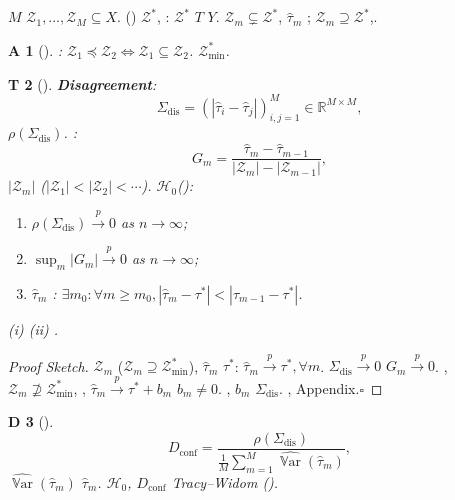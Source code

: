 \documentclass[11pt,a4paper,twoside]{article}
\newtheorem{theorem}Theorem[section]
\newtheorem{definition}[theorem]Definition
\newtheorem{assumption}[theorem]Assumption
\DeclareMathOperator*{\Var}{\mathbb{V}\mathrm{ar}}
\begin{document}
\subsection{}
 $M$ $\mathcal{Z}_1, \ldots, \mathcal{Z}_M \subseteq X$.
() $\mathcal{Z}^*$, 
: $\mathcal{Z}^*$ $T$ $Y$.
 $\mathcal{Z}_m \subsetneq \mathcal{Z}^*$, $\hat{\tau}_m$ ; 
 $\mathcal{Z}_m \supseteq \mathcal{Z}^*$,.
\begin{assumption}[]\label{ass:poset}
: $\mathcal{Z}_1 \preceq \mathcal{Z}_2 \iff \mathcal{Z}_1 \subseteq \mathcal{Z}_2$.
 $\mathcal{Z}_{\min}^*$.
\end{assumption}
\begin{theorem}[]\label{thm:confound}
\textbf{Disagreement}: 
\[
\Sigma_{\text{dis}} = \left(|\hat{\tau}_i - \hat{\tau}_j| \right)_{i,j=1}^{M} \in \mathbb{R}^{M \times M},
\]
 $\rho(\Sigma_{\text{dis}})$.
: 
\[
G_m = \frac{\hat{\tau}_m - \hat{\tau}_{m-1}}{|\mathcal{Z}_m| - |\mathcal{Z}_{m-1}|},
\]
 $|\mathcal{Z}_m|$ ($|\mathcal{Z}_1| < |\mathcal{Z}_2| < \cdots$).
 $\mathcal{H}_0$(): 
\begin{enumerate}[label=(\roman*)]
 \item $\rho(\Sigma_{\text{dis}}) \xrightarrow{p} 0$ as $n \to \infty$; 
 \item $\sup_{m} |G_m| \xrightarrow{p} 0$ as $n \to \infty$; 
 \item $\hat{\tau}_m$ : 
 $\exists m_0: \forall m \geq m_0, |\hat{\tau}_m - \tau^*| < |\hat{\tau}_{m-1} - \tau^*|$.
\end{enumerate}
 (i) (ii) .
\end{theorem}
\begin{proof}[Proof Sketch]
 $\mathcal{Z}_m$ ($\mathcal{Z}_m \supseteq \mathcal{Z}^*_{\min}$), 
 $\hat{\tau}_m$ $\tau^*$: 
$\hat{\tau}_m \xrightarrow{p} \tau^*, \forall m$.
 $\Sigma_{\text{dis}} \xrightarrow{p} 0$ $G_m \xrightarrow{p} 0$.
, $\mathcal{Z}_m \not\supseteq \mathcal{Z}^*_{\min}$, 
, $\hat{\tau}_m \xrightarrow{p} \tau^* + b_m$ $b_m \neq 0$.
, $b_m$ $\Sigma_{\text{dis}}$.
, Appendix.\hfill $\square$
\end{proof}
\begin{definition}[]
\[
D_{\text{conf}} = \frac{\rho(\Sigma_{\text{dis}})}
 {\frac{1}{M}\sum_{m=1}^{M} \widehat{\Var}(\hat{\tau}_m)},
\]
 $\widehat{\Var}(\hat{\tau}_m)$ $\hat{\tau}_m$.
 $\mathcal{H}_0$, $D_{\text{conf}}$ 
Tracy--Widom ().
\end{definition}
\begin{honestbox}
\textbf{Honest Strike:}, }
\textbf{"Missing""".} 
, $\rho(\Sigma_{\text{dis}})$ 
\textbf{Honest Strike: } ---
\end{honestbox}
\end{document}
